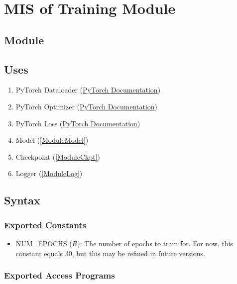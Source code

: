 \documentclass[12pt, titlepage]{article}
\begin{document}
\section{MIS of Training Module} \label{ModuleTrain}

\subsection{Module}



\subsection{Uses}
\begin{enumerate}
  \item PyTorch Dataloader (\href{https://pytorch.org/tutorials/beginner/basics/data_tutorial.html}{PyTorch Documentation})
  \item PyTorch Optimizer (\href{https://pytorch.org/docs/stable/optim.html}{PyTorch Documentation})
  \item PyTorch Loss (\href{https://pytorch.org/docs/stable/nn.html#loss-functions}{PyTorch Documentation})
  \item Model (\ref{ModuleModel})
  \item Checkpoint (\ref{ModuleCkpt})
  \item Logger (\ref{ModuleLog})
\end{enumerate}

\subsection{Syntax}



\subsubsection{Exported Constants}

\begin{itemize}
  \item NUM\_EPOCHS ($R$): The number of epochs to train for. For now, this constant equals 30, but this may be refined in future versions.
\end{itemize}

\subsubsection{Exported Access Programs}
\end{document}
